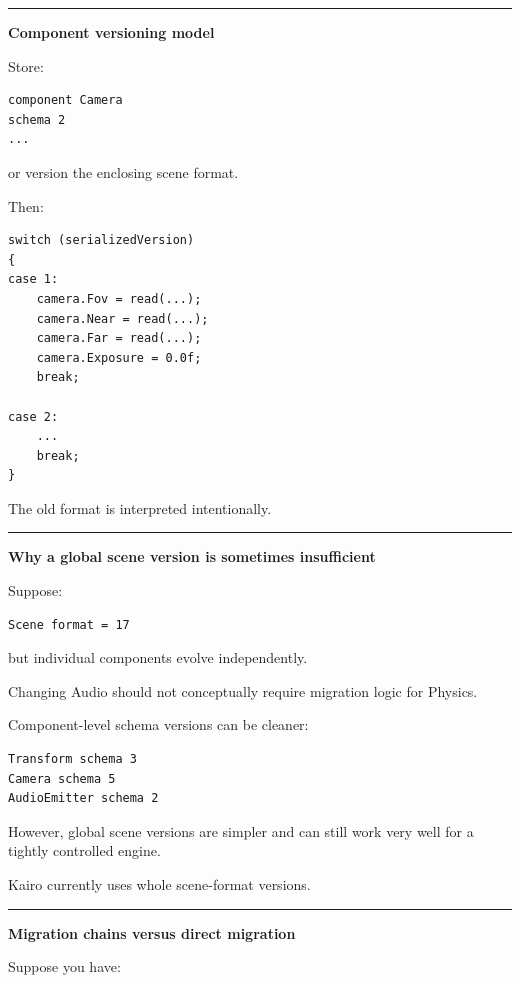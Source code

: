 \begin{center}\rule{0.5\linewidth}{0.5pt}\end{center}

\textbf{Component versioning model}

Store:

\begin{verbatim}
component Camera
schema 2
...
\end{verbatim}

or version the enclosing scene format.

Then:

\begin{verbatim}
switch (serializedVersion)
{
case 1:
    camera.Fov = read(...);
    camera.Near = read(...);
    camera.Far = read(...);
    camera.Exposure = 0.0f;
    break;

case 2:
    ...
    break;
}
\end{verbatim}

The old format is interpreted intentionally.

\begin{center}\rule{0.5\linewidth}{0.5pt}\end{center}

\textbf{Why a global scene version is sometimes insufficient}

Suppose:

\begin{verbatim}
Scene format = 17
\end{verbatim}

but individual components evolve independently.

Changing Audio should not conceptually require migration logic for Physics.

Component-level schema versions can be cleaner:

\begin{verbatim}
Transform schema 3
Camera schema 5
AudioEmitter schema 2
\end{verbatim}

However, global scene versions are simpler and can still work very well for a tightly controlled engine.

Kairo currently uses whole scene-format versions.

\begin{center}\rule{0.5\linewidth}{0.5pt}\end{center}

\textbf{Migration chains versus direct migration}

Suppose you have:

